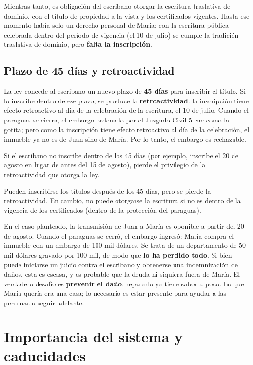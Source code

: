 \documentclass[12pt,oneside]{book}
\begin{document}
Mientras tanto, es obligación del escribano otorgar la escritura traslativa de dominio, con el título de propiedad a la vista y los certificados vigentes. Hasta ese momento había solo un derecho personal de María; con la escritura pública celebrada dentro del período de vigencia (el 10 de julio) se cumple la tradición traslativa de dominio, pero \textbf{falta la inscripción}.

\subsection{Plazo de 45 días y retroactividad}

La ley concede al escribano un nuevo plazo de \textbf{45 días} para inscribir el título. Si lo inscribe dentro de ese plazo, se produce la \textbf{retroactividad}: la inscripción tiene efecto retroactivo al día de la celebración de la escritura, el 10 de julio. Cuando el paraguas se cierra, el embargo ordenado por el Juzgado Civil 5 cae como la gotita; pero como la inscripción tiene efecto retroactivo al día de la celebración, el inmueble ya no es de Juan sino de María. Por lo tanto, el embargo es rechazable.

Si el escribano no inscribe dentro de los 45 días (por ejemplo, inscribe el 20 de agosto en lugar de antes del 15 de agosto), pierde el privilegio de la retroactividad que otorga la ley.

\begin{importante}
Pueden inscribirse los títulos después de los 45 días, pero se pierde la retroactividad. En cambio, no puede otorgarse la escritura si no es dentro de la vigencia de los certificados (dentro de la protección del paraguas).
\end{importante}

En el caso planteado, la transmisión de Juan a María es oponible a partir del 20 de agosto. Cuando el paraguas se cerró, el embargo ingresó: María compra el inmueble con un embargo de 100 mil dólares. Se trata de un departamento de 50 mil dólares gravado por 100 mil, de modo que \textbf{lo ha perdido todo}. Si bien puede iniciarse un juicio contra el escribano y obtenerse una indemnización de daños, esta es escasa, y es probable que la deuda ni siquiera fuera de María. El verdadero desafío es \textbf{prevenir el daño}: repararlo ya tiene sabor a poco. Lo que María quería era una casa; lo necesario es estar presente para ayudar a las personas a seguir adelante.

\section{Importancia del sistema y caducidades}
\end{document}
